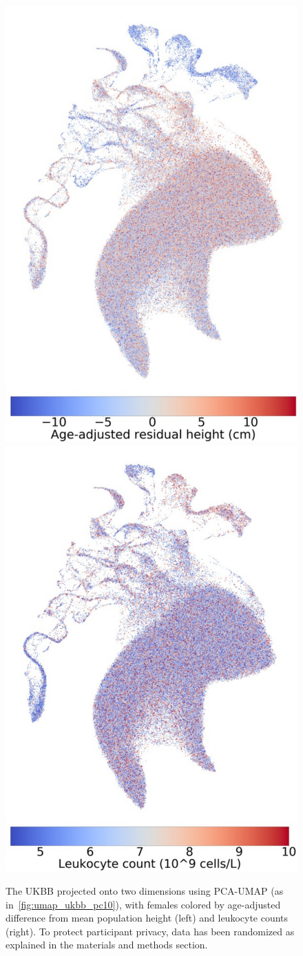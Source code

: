 \documentclass[12pt]{pnas-new}
\begin{document}
\begin{figure}
    \centering
    \includegraphics[width=0.4\columnwidth]{images/UKBB_UMAP_PC10_NN15_MD05_2018328174511_2018714161841_Height_res_pct1_f.pdf}
    \includegraphics[width=.4\columnwidth]{images/UKBB_UMAP_PC10_NN15_MD05_2018328174511_201871416519_leukocyte_count_pct5_f.pdf}
    \caption{The UKBB projected onto two dimensions using PCA-UMAP (as in~\ref{fig:umap_ukbb_pc10}), with females colored by age-adjusted difference from mean population height (left) and leukocyte counts (right). To protect participant privacy, data has been randomized as explained in the materials and methods section.}
    \label{fig:umap_height_female}
\end{figure}
\end{document}
